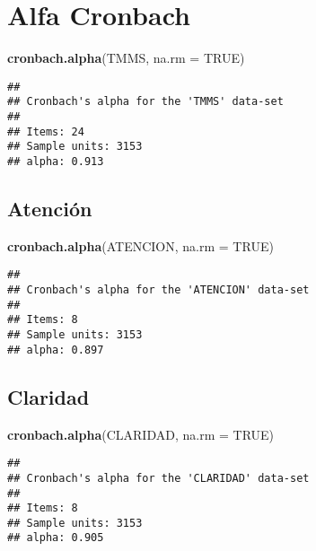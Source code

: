 \documentclass[
  10pt,
  spanish,
]{article}
\newenvironment{Shaded}{\begin{snugshade}}{\end{snugshade}}
\newcommand{\DataTypeTok}[1]{\textcolor[rgb]{0.13,0.29,0.53}{#1}}
\newcommand{\KeywordTok}[1]{\textcolor[rgb]{0.13,0.29,0.53}{\textbf{#1}}}
\newcommand{\NormalTok}[1]{#1}
\newcommand{\OtherTok}[1]{\textcolor[rgb]{0.56,0.35,0.01}{#1}}
\begin{document}
\hypertarget{alfa-cronbach}{%
\section{Alfa Cronbach}\label{alfa-cronbach}}

\begin{Shaded}
\begin{Highlighting}[]
\KeywordTok{cronbach.alpha}\NormalTok{(TMMS, }\DataTypeTok{na.rm =} \OtherTok{TRUE}\NormalTok{)}
\end{Highlighting}
\end{Shaded}

\begin{verbatim}
## 
## Cronbach's alpha for the 'TMMS' data-set
## 
## Items: 24
## Sample units: 3153
## alpha: 0.913
\end{verbatim}

\hypertarget{atenciuxf3n-3}{%
\subsection{Atención}\label{atenciuxf3n-3}}

\begin{Shaded}
\begin{Highlighting}[]
\KeywordTok{cronbach.alpha}\NormalTok{(ATENCION, }\DataTypeTok{na.rm =} \OtherTok{TRUE}\NormalTok{)}
\end{Highlighting}
\end{Shaded}

\begin{verbatim}
## 
## Cronbach's alpha for the 'ATENCION' data-set
## 
## Items: 8
## Sample units: 3153
## alpha: 0.897
\end{verbatim}

\hypertarget{claridad-4}{%
\subsection{Claridad}\label{claridad-4}}

\begin{Shaded}
\begin{Highlighting}[]
\KeywordTok{cronbach.alpha}\NormalTok{(CLARIDAD, }\DataTypeTok{na.rm =} \OtherTok{TRUE}\NormalTok{)}
\end{Highlighting}
\end{Shaded}

\begin{verbatim}
## 
## Cronbach's alpha for the 'CLARIDAD' data-set
## 
## Items: 8
## Sample units: 3153
## alpha: 0.905
\end{verbatim}
\end{document}
